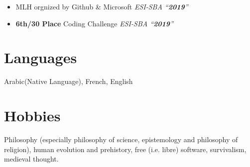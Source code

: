 \documentclass{cv}
\begin{document}
\begin{itemize}
  \item \award  MLH orgnized by Github \& Microsoft \emph{ESI-SBA ``\textbf{2019}''}
\end{itemize}

\begin{itemize}
  \item \award  \textbf{6th/30 Place} Coding Challenge \emph{ESI-SBA ``\textbf{2019}''}
\end{itemize}

\section{Languages}
Arabic(Native Language), French, English
\section{Hobbies}

Philosophy (especially philosophy of science, epistemology and philosophy of religion), human evolution and prehistory, free (i.e. libre) software, survivalism, medieval thought.

\end{document}

